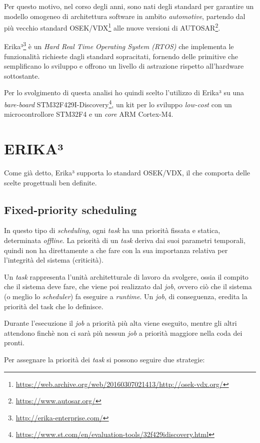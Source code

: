 \documentclass{article}
\begin{document}
Per questo motivo, nel corso degli anni, sono nati degli standard per garantire un modello omogeneo di architettura software in ambito \textit{automotive}, partendo dal più vecchio standard OSEK/VDX\footnote{\url{https://web.archive.org/web/20160307021413/http://osek-vdx.org/}} alle nuove versioni di AUTOSAR\footnote{\url{https://www.autosar.org/}}.

Erika³\footnote{\url{http://erika-enterprise.com/}} è un \textit{Hard Real Time Operating System (RTOS)} che implementa le funzionalità richieste dagli standard sopracitati, fornendo delle primitive che semplificano lo sviluppo e offrono un livello di astrazione rispetto all'hardware sottostante.

Per lo svolgimento di questa analisi ho quindi scelto l'utilizzo di Erika³ su una \textit{bare-board} STM32F429I-Discovery\footnote{\url{https://www.st.com/en/evaluation-tools/32f429idiscovery.html}}, un kit per lo sviluppo \textit{low-cost} con un microcontrollore STM32F4 e un \textit{core} ARM Cortex-M4.

\section{ERIKA³}
Come già detto, Erika³ supporta lo standard OSEK/VDX, il che comporta delle scelte progettuali ben definite.

\subsection{Fixed-priority scheduling}
In questo tipo di \textit{scheduling}, ogni \textit{task} ha una priorità fissata e statica, determinata \textit{offline}. La priorità di un \textit{task} deriva dai suoi parametri temporali, quindi non ha direttamente a che fare con la sua importanza relativa per l'integrità del sistema (criticità).

Un \textit{task} rappresenta l'unità architetturale di lavoro da svolgere, ossia il compito che il sistema deve fare, che viene poi realizzato dal \textit{job}, ovvero ciò che il sistema (o meglio lo \textit{scheduler}) fa eseguire a \textit{runtime}. Un \textit{job}, di conseguenza, eredita la priorità del task che lo definisce.

Durante l'esecuzione il \textit{job} a priorità più alta viene eseguito, mentre gli altri attendono finchè non ci sarà più nessun \textit{job} a priorità maggiore nella coda dei pronti.

Per assegnare la priorità dei \textit{task} si possono seguire due strategie:
\end{document}
